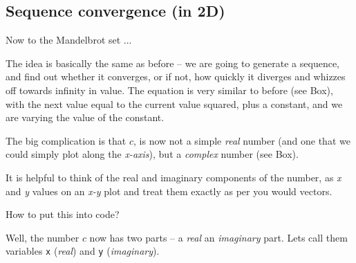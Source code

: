 \documentclass{tufte-book} %
\begin{document}

\subsection{Sequence convergence (in 2D)}

Now to the Mandelbrot set ...

The idea is basically the same as before -- we are going to generate a sequence, and find out whether it converges, or if not, how quickly it diverges and whizzes off towards infinity in value. The equation is very similar to before (see Box), with the next value equal to the current value squared, plus a constant, and we are varying the value of the constant.

The big complication is that \(c\), is now not a simple \textit{real} number (and one that we could simply plot along the \textit{x-axis}), but a \textit{complex} number (see Box).


It is helpful to think of the real and imaginary components of the number, as \textit{x} and \textit{y} values on an \textit{x-y} plot and treat them exactly as per you would vectors.

How to put this into code?

Well, the number \(c\) now has two parts -- a \textit{real} an \textit{imaginary} part. Lets call them variables \texttt{x} (\textit{real}) and \texttt{y} (\textit{imaginary}).
\end{document}
